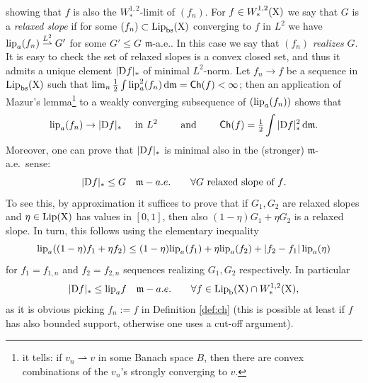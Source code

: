 \documentclass[11pt]{article}
\numberwithin{equation}{section}
\newcommand{\X}{{\rm X}}
\newcommand{\mm}{{\mathfrak m}}
\newcommand{\ch}{{\sf Ch}}
\renewcommand{\d}{{\rm d}}
\newcommand{\D}{{\rm D}}
\newcommand{\lip}{{\rm lip}}
\newcommand{\Lip}{{\rm Lip}}
\newcommand{\lipa}{{\rm lip}_a}
\newcommand{\bs}{{\rm bs}}
\renewcommand{\b}{{\rm b}}
\newcommand{\weakto}{\rightharpoonup}
\begin{document}
showing that $f$ is also the $W^{1,2}_*$-limit of $(f_n)$. For $f\in W^{1,2}_*(\X)$ we say that $G$ is a \emph{relaxed slope} if for some $(f_n)\subset\Lip_\bs(\X)$ converging to $f$ in $L^2$ we have $\lip_a(f_n)\stackrel{L^2}\weakto G'$ for some $G'\leq G$ $\mm$-a.e.. In this case we say that $(f_n)$ \emph{realizes} $G$. It is easy to check the set of relaxed slopes is  a convex closed set, and thus it admits a unique element $|\D f|_*$ of minimal $L^2$-norm. Let  $f_n\to f$ be a sequence in $\Lip_\bs(\X)$ such that $\lim_n\tfrac12\int\lipa^2(f_n)\,\d\mm=\ch(f)<\infty$; then an application of Mazur's lemma\footnote{it tells: if $v_n\weakto v$ in some Banach space $B$, then there are convex combinations of the $v_n$'s strongly converging to $v$.} to a weakly converging subsequence of $(\lipa(f_n))$ shows that 
\begin{equation}
\label{eq:perdenslip}
\lipa(f_n)\to |\D f|_*\quad\text{ in $L^2\qquad$ and }\qquad \ch(f)=\tfrac12\int|\D f|^2_*\,\d\mm.
\end{equation}
 Moreover, one can prove that $|\D f|_*$ is minimal also in the (stronger) $\mm$-a.e.\ sense:
\[
|\D f|_*\leq G\quad\mm-a.e.\qquad\forall G\text{ relaxed slope of $f$.}
\]
To see this, by approximation it  suffices to prove that if $G_1,G_2$ are relaxed slopes and $\eta\in\Lip(\X)$ has values in $[0,1]$, then also $(1-\eta)G_1+\eta G_2$ is a relaxed slope. In turn, this follows using the elementary inequality
\[
\lipa((1-\eta)f_1+\eta f_2)\leq (1-\eta)\lipa(f_1)+ \eta\lipa(  f_2)+|f_2-f_1|\,\lipa(\eta)
\]
for $f_1=f_{1,n}$ and $f_2=f_{2,n}$ sequences realizing $G_1,G_2$ respectively. In particular
\begin{equation}
\label{eq:dflip}
|\D f|_*\leq\lipa f\quad\mm-a.e.\qquad \forall  f\in\Lip_\b(\X)\cap W^{1,2}_*(\X),
\end{equation}
as it is obvious picking $f_n:=f$ in Definition \ref{def:ch} (this is possible at least if $f$ has also bounded support, otherwise  one uses a cut-off argument). 
\end{document}
